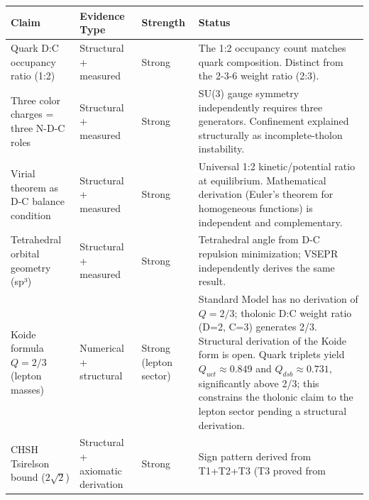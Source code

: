 \documentclass[12pt]{article}
\begin{document}
\begin{longtable}[]{@{}
  >{\raggedright\arraybackslash}p{}
  >{\raggedright\arraybackslash}p{}
  >{\raggedright\arraybackslash}p{}
  >{\raggedright\arraybackslash}p{}@{}}
\toprule\noalign{}
\begin{minipage}[b]{\linewidth}\raggedright
Claim
\end{minipage} & \begin{minipage}[b]{\linewidth}\raggedright
Evidence Type
\end{minipage} & \begin{minipage}[b]{\linewidth}\raggedright
Strength
\end{minipage} & \begin{minipage}[b]{\linewidth}\raggedright
Status
\end{minipage} \\
\midrule\noalign{}
\endhead
\bottomrule\noalign{}
\endlastfoot
Quark D:C occupancy ratio (1:2) & Structural + measured & Strong & The
1:2 occupancy count matches quark composition. Distinct from the 2-3-6
weight ratio (2:3). \\
Three color charges = three N-D-C roles & Structural + measured & Strong
& SU(3) gauge symmetry independently requires three generators.
Confinement explained structurally as incomplete-tholon instability. \\
Virial theorem as D-C balance condition & Structural + measured & Strong
& Universal 1:2 kinetic/potential ratio at equilibrium. Mathematical
derivation (Euler's theorem for homogeneous functions) is independent
and complementary. \\
Tetrahedral orbital geometry (sp³) & Structural + measured & Strong &
Tetrahedral angle from D-C repulsion minimization; VSEPR independently
derives the same result. \\
Koide formula \(Q = 2/3\) (lepton masses) & Numerical + structural &
Strong (lepton sector) & Standard Model has no derivation of
\(Q = 2/3\); tholonic D:C weight ratio (D=2, C=3) generates 2/3.
Structural derivation of the Koide form is open. Quark triplets yield
\(Q_{uct} \approx 0.849\) and \(Q_{dsb} \approx 0.731\), significantly
above 2/3; this constrains the tholonic claim to the lepton sector
pending a structural derivation. \\
CHSH Tsirelson bound (\(2\sqrt{2}\)) & Structural + axiomatic derivation
& Strong & Sign pattern derived from T1+T2+T3 (T3 proved from

\end{longtable}
\end{document}
